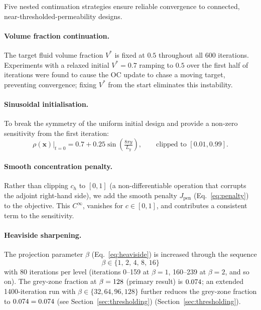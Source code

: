 \label{sec:continuation}
Five nested continuation strategies ensure reliable convergence to
connected, near-thresholded-permeability designs.

\paragraph{Volume fraction continuation.}
The target fluid volume fraction $V^*$ is fixed at $0.5$ throughout
all 600 iterations.
Experiments with a relaxed initial $V^*=0.7$ ramping to $0.5$ over
the first half of iterations were found to cause the OC update to
chase a moving target, preventing convergence; fixing $V^*$ from the
start eliminates this instability.

\paragraph{Sinusoidal initialisation.}
To break the symmetry of the uniform initial design and provide a
non-zero sensitivity from the first iteration:
\begin{equation}
  \rho(\mathbf{x})\big|_{t=0}
  = 0.7 + 0.25\sin\!\left(\tfrac{8\pi y}{L_y}\right),
  \qquad \text{clipped to } [0.01, 0.99].
  \label{eq:sinusoidal_init}
\end{equation}

\paragraph{Smooth concentration penalty.}
Rather than clipping $c_h$ to $[0,1]$ (a non-differentiable operation
that corrupts the adjoint right-hand side), we add the smooth penalty
$J_{\mathrm{pen}}$ (Eq.~\eqref{eq:penalty}) to the objective.
This $C^\infty$, vanishes for $c \in [0,1]$, and contributes a
consistent term to the sensitivity.

\paragraph{Heaviside sharpening.}
The projection parameter $\beta$ (Eq.~\eqref{eq:heaviside}) is increased
through the sequence
\[
    \beta \in \{1,\,2,\,4,\,8,\,16\}
\]
with 80 iterations per level (iterations 0--159 at $\beta=1$,
160--239 at $\beta=2$, and so on).
The grey-zone fraction at $\beta=128$ (primary result) is $0.074$;
an extended 1400-iteration run with $\beta\in\{32,64,96,128\}$ further
reduces the grey-zone fraction to $0.074=0.074$
(see Section~\ref{sec:thresholding})
(Section~\ref{sec:thresholding}).

